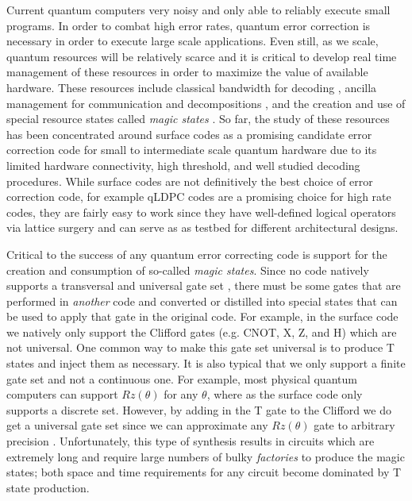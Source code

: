 Current quantum computers very noisy and only able to reliably execute small programs. In order to combat high error rates, quantum error correction is necessary in order to execute large scale applications. Even still, as we scale, quantum resources will be relatively scarce and it is critical to develop real time management of these resources in order to maximize the value of available hardware. These resources include classical bandwidth for decoding \cite{ravi2023better}, ancilla management for communication and decompositions \cite{ding2020square}, and the creation and use of special resource states called \textit{magic states} \cite{ding2018magic, litinski2019magic}. So far, the study of these resources has been concentrated around surface codes as a promising candidate error correction code for small to intermediate scale quantum hardware \cite{litinski2019game, gidney2021factor} due to its limited hardware connectivity, high threshold, and well studied decoding procedures. While surface codes are not definitively the best choice of error correction code, for example qLDPC codes \cite{bravyi2023high, xu2023constant} are a promising choice for high rate codes, they are fairly easy to work since they have well-defined logical operators via lattice surgery \cite{horsman2012surface} and can serve as as testbed for different architectural designs.

Critical to the success of any quantum error correcting code is support for the creation and consumption of so-called \textit{magic states}. Since no code natively supports a transversal and universal gate set \cite{eastin2009restrictions}, there must be some gates that are performed in \textit{another} code and converted or distilled into special states that can be used to apply that gate in the original code. For example, in the surface code we natively only support the Clifford gates (e.g. CNOT, X, Z, and H) which are not universal. One common way to make this gate set universal is to produce T states and inject them as necessary. It is also typical that we only support a finite gate set and not a continuous one. For example, most physical quantum computers can support $Rz(\theta)$ for any $\theta$, where as the surface code only supports a discrete set. However, by adding in the T gate to the Clifford we do get a universal gate set since we can approximate any $Rz(\theta)$ gate to arbitrary precision \cite{ross2014optimal}. Unfortunately, this type of synthesis results in circuits which are extremely long and require large numbers of bulky \textit{factories} to produce the magic states; both space and time requirements for any circuit become dominated by T state production. 

